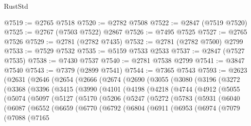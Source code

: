 \begin{lexlean}{RustStd}
\begin{coremodule}
@7519 := @2765 @7518
@7520 := @2782 @7508
@7522 := @2847 (@7519 @7520)
@7525 := @2767 (@7503 @7522) @2867
@7526 := @7495 @7525
@7527 := @2765 @7526
@7529 := @2781 (@2782 @7435)
@7532 := @2781 (@2782 @7500) @2799
@7533 := @7529 @7532
@7535 := @5159 @7533 @2533
@7537 := @2847 (@7527 @7535)
@7538 := @7430 @7537
@7540 := @2781 @7538 @2799
@7541 := @3847 @7540
@7543 := @7379 (@2899 @7541)
@7544 := @7365 @7543
@7593 := @2623
    (@2631
      (@2646
        (@2654
          (@2666
            (@2674
              (@2690
                (@3055
                  (@3080
                    (@3196
                      (@3272
                        (@3368
                          (@3396
                            (@3415
                              (@3990
                                (@4101
                                  (@4198
                                    (@4218
                                      (@4744
                                        (@4912
                                          (@5055
                                            (@5074
                                              (@5097
                                                (@5127
                                                  (@5170
                                                    (@5206
                                                      (@5247
                                                        (@5272
                                                          (@5783
                                                            (@5931
                                                              (@6040
                                                                (@6087
                                                                  (@6552
                                                                    (@6659
                                                                      (@6770
                                                                        (@6792
                                                                          (@6804
                                                                            (@6911
                                                                              (@6953
                                                                                (@6974
                                                                                  (@7079
                                                                                    (@7088
                                                                                      (@7165

\end{coremodule}
\end{lexlean}
